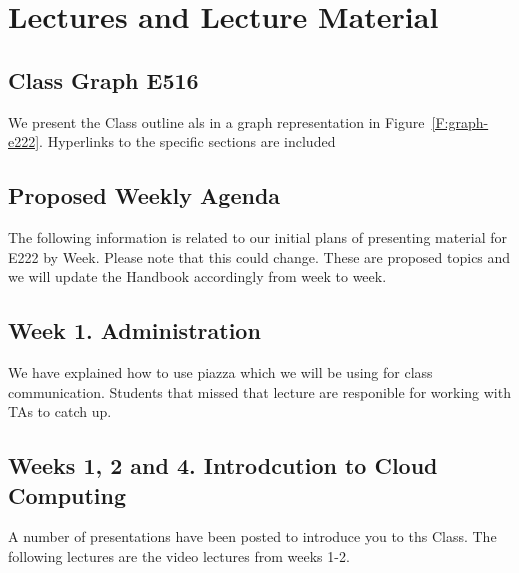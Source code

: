 \section{Lectures and Lecture Material}

\subsection{Class Graph E516}
\label{s:graph-516}

We present the Class outline als in a graph representation in
Figure~\ref{F:graph-e222}. Hyperlinks to the specific sections are included





\subsection{Proposed Weekly Agenda}

\begin{WARNING}

The following information is related to our initial plans of
presenting material for E222 by Week. Please note that this could
change. These are proposed topics and we will update the Handbook
accordingly from week to week.

\end{WARNING}

\subsection{Week 1. Administration}

We have explained how to use piazza which we will be using for class
communication. Students that missed that lecture are responible for
working with TAs to catch up.

\subsection{Weeks 1, 2 and 4. Introdcution to Cloud Computing}

A number of presentations have been posted to introduce you to ths
Class. The following lectures are the video lectures from weeks 1-2.

